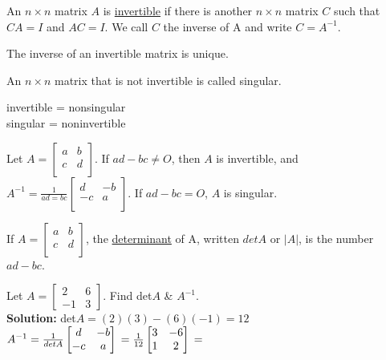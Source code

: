 \documentclass{report}
\begin{document}
\begin{definition}
An $n\times n$ matrix $A$ is \underline{invertible} if there is another $n\times n$ matrix $C$ such that $CA=I$ and $AC=I$. We call $C$ the inverse of A and write $C=A^{-1}$.
\end{definition}

\begin{proposition}
The inverse of an invertible matrix is unique.
\end{proposition}

\begin{definition}
An $n\times n$ matrix that is not invertible is called singular.
\begin{center}
	invertible = nonsingular\\
	singular = noninvertible
\end{center}
\end{definition}

\begin{theorem}
Let $A = \begin{bmatrix}
a & b \\
c & d \\
\end{bmatrix}$.
If $ad-bc \neq O$, then $A$ is invertible, and $A^{-1} = \frac{1}{ad=bc}\begin{bmatrix}
	d & -b \\
	-c & a \\
\end{bmatrix}$. If $ad - bc = O$, $A$ is singular.
\end{theorem}

\begin{definition}
If $A = \begin{bmatrix}
	a & b \\
	c & d \\
	\end{bmatrix}$, the \underline{determinant} of A, written $detA$ or $|A|$, is the number $ad - bc$.
\end{definition}

\begin{example}
Let $A = \begin{bmatrix} 2 & 6 \\ -1 & 3 \end{bmatrix}$. Find det$A$ \& $A^{-1}$.\\
\smallskip\textbf{Solution:}
det$A = (2)(3) - (6)(-1) = 12$\\
$A^{-1} = \frac{1}{det A}\begin{bmatrix} d & -b \\ -c & a \end{bmatrix}\\
= \frac{1}{12} \begin{bmatrix} 3 & -6 \\ 1 & 2 \end{bmatrix}\\
= $
\end{example}
\end{document}
